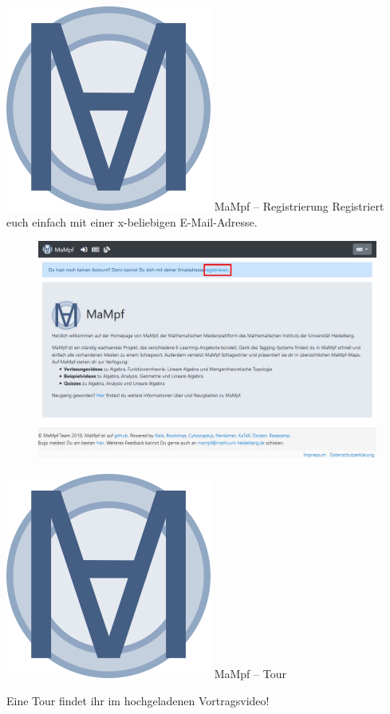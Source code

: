 \begin{frame}{\includegraphics[scale=0.072]{images/mampf.png} MaMpf -- Registrierung}
		Registriert euch einfach mit einer x-beliebigen E-Mail-Adresse.\\
		\begin{figure}
			\centering
			\includegraphics[scale=0.3]{images/mampf01.jpg}
		\end{figure}
\end{frame}

\begin{frame}{\includegraphics[scale=0.072]{images/mampf.png} MaMpf -- Tour}
	\vspace{6em}
	\begin{center}
		\Large Eine Tour findet ihr im hochgeladenen Vortragsvideo!
	\end{center}
\end{frame}


